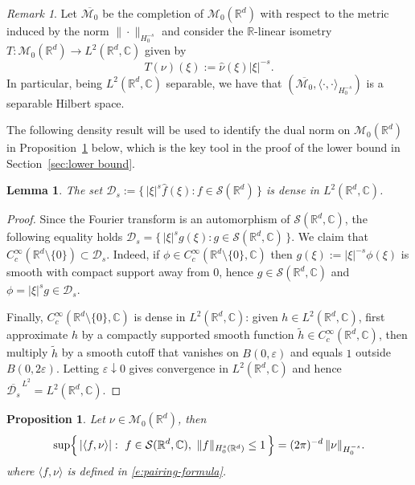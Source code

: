 \documentclass[12pt,a4paper,oneside]{amsart}
\theoremstyle{plain}
\newtheorem{proposition}[theorem]{Proposition}
\newtheorem{lemma}[theorem]{Lemma}
\theoremstyle{definition}
\numberwithin{equation}{section}
\numberwithin{figure}{section}
\numberwithin{table}{section}
\theoremstyle{remark}
\newtheorem{remark}[theorem]{Remark}
\newcommand{\R}{\mathbb{R}}
\newcommand{\calM}{\mathcal{M}}
\newcommand{\Fhat}[1]{\widehat{#1}}
\begin{document}
\begin{remark}
 Let $\overline{\calM_0}$ be the completion of $\calM_0(\R^d)$ with respect to the metric induced by the norm
$\|\cdot\|_{H_0^{-s}}$ and consider the $\R$-linear isometry $T:\calM_0(\R^d)\to L^2(\R^d,\mathbb{C})$ given by 
\begin{equation*}
    T(\nu)(\xi):= \Fhat{\nu}(\xi)|\xi|^{-s}.
\end{equation*}
In particular, being $L^2(\R^d,\mathbb{C})$ separable, we have that $(\overline{\calM_0},\langle\cdot,\cdot\rangle_{H^{-s}_0})$ is a separable Hilbert space.
\end{remark}
% 
The following density result will be used to identify the dual norm 
on $\calM_0(\R^d)$ in Proposition~\ref{p:dual-norm-exact} below, 
which is the key tool in the proof of the lower bound in 
Section~\ref{sec:lower bound}.
% 
\begin{lemma}\label{l:dense-weighted-Schwartz}
The set $\mathcal D_s
:=\bigl\{\,|\xi|^{s}\Fhat{f}(\xi): f\in\mathcal S(\R^d)\,\bigr\}$ is dense in $L^2(\R^d,\mathbb{C})$.
\end{lemma}

\begin{proof}
Since the Fourier transform is an automorphism of $\mathcal S(\R^d,\mathbb{C})$, the following equality holds $\mathcal D_s=\{\,|\xi|^{s}g(\xi): g\in\mathcal S(\R^d,\mathbb{C})\,\}.
$ We claim that $C_c^\infty(\R^d\setminus\{0\})\subset \mathcal D_s$.
Indeed, if $\phi\in C_c^\infty(\R^d\setminus\{0\},\mathbb{C})$ then $g(\xi):=|\xi|^{-s}\phi(\xi)$ is smooth with compact support
away from $0$, hence $g\in\mathcal S(\R^d,\mathbb{C})$ and $\phi=|\xi|^{s}g\in\mathcal D_s$.

Finally, $C_c^\infty(\R^d\setminus\{0\},\mathbb{C})$ is dense in $L^2(\R^d,\mathbb{C})$:
given $h\in L^2(\R^d,\mathbb{C})$, first approximate $h$ by a compactly supported smooth function $\tilde h\in C_c^\infty(\R^d,\mathbb{C})$,
then multiply $\tilde h$ by a smooth cutoff that vanishes on $B(0,\varepsilon)$ and equals $1$ outside $B(0,2\varepsilon)$.
Letting $\varepsilon\downarrow 0$ gives convergence in $L^2(\R^d,\mathbb{C})$ and hence $\overline{\mathcal D_s}^{\,L^2}=L^2(\R^d,\mathbb{C})$.
\end{proof}

\begin{proposition}\label{p:dual-norm-exact}
Let $\nu\in {\calM_0}(\R^d)$, then
\begin{equation}\label{eq:dual-norm-exact}
\sup\Bigl\{\,|\langle f,\nu\rangle|:\ f\in\mathcal S(\R^d,\mathbb{C}),\ \|f\|_{H_0^{s}(\R^d)}\le 1\,\Bigr\}
=(2\pi)^{-d}\,\|\nu\|_{H^{-s}_0}.
\end{equation}
where $\langle f,\nu \rangle$ is defined in \eqref{e:pairing-formula}.
\end{proposition}
\end{document}
